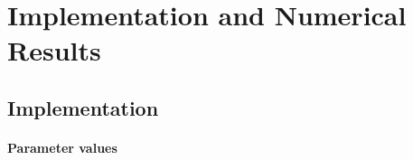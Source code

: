 \section{Implementation and Numerical Results}
\label{sec:84results}


\parbox{1em}{}
\vspace{-3em}



\printornamentsfalse
\subsection{Implementation}
\label{sec:841implementation}
\printornamentstrue

\paragraph{Parameter values}

